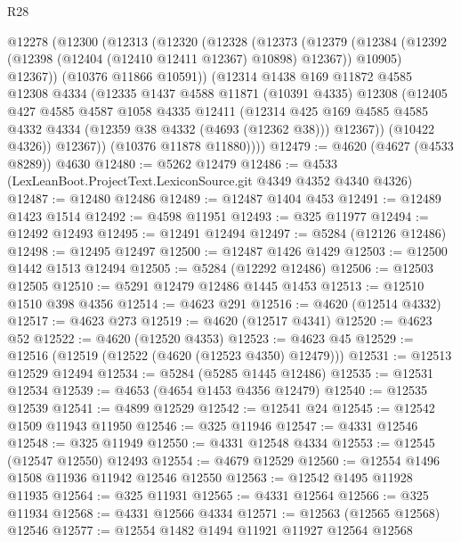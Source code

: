 \begin{lexlean}{R28}
\begin{coremodule}
    @12278
      (@12300
        (@12313
          (@12320
            (@12328
              (@12373
                (@12379
                  (@12384 (@12392 (@12398 (@12404 (@12410 @12411 @12367) @10898) @12367)) @10905)
                  @12367))
              (@10376 @11866 @10591))
            (@12314
              @1438
              @169
              @11872
              @4585
              @12308
              @4334
              (@12335
                @1437
                @4588
                @11871
                (@10391 @4335)
                @12308
                (@12405
                  @427
                  @4585
                  @4587
                  @1058
                  @4335
                  @12411
                  (@12314
                    @425
                    @169
                    @4585
                    @4585
                    @4332
                    @4334
                    (@12359 @38 @4332 (@4693 (@12362 @38)))
                    @12367))
                (@10422 @4326))
              @12367))
          (@10376 @11878 @11880))))
@12479 := @4620 (@4627 (@4533 @8289)) @4630
@12480 := @5262 @12479
@12486 := @4533 (LexLeanBoot.ProjectText.LexiconSource.git @4349 @4352 @4340 @4326)
@12487 := @12480 @12486
@12489 := @12487 @1404 @453
@12491 := @12489 @1423 @1514
@12492 := @4598 @11951
@12493 := @325 @11977
@12494 := @12492 @12493
@12495 := @12491 @12494
@12497 := @5284 (@12126 @12486)
@12498 := @12495 @12497
@12500 := @12487 @1426 @1429
@12503 := @12500 @1442 @1513 @12494
@12505 := @5284 (@12292 @12486)
@12506 := @12503 @12505
@12510 := @5291 @12479 @12486 @1445 @1453
@12513 := @12510 @1510 @398 @4356
@12514 := @4623 @291
@12516 := @4620 (@12514 @4332)
@12517 := @4623 @273
@12519 := @4620 (@12517 @4341)
@12520 := @4623 @52
@12522 := @4620 (@12520 @4353)
@12523 := @4623 @45
@12529 := @12516 (@12519 (@12522 (@4620 (@12523 @4350) @12479)))
@12531 := @12513 @12529 @12494
@12534 := @5284 (@5285 @1445 @12486)
@12535 := @12531 @12534
@12539 := @4653 (@4654 @1453 @4356 @12479)
@12540 := @12535 @12539
@12541 := @4899 @12529
@12542 := @12541 @24
@12545 := @12542 @1509 @11943 @11950
@12546 := @325 @11946
@12547 := @4331 @12546
@12548 := @325 @11949
@12550 := @4331 @12548 @4334
@12553 := @12545 (@12547 @12550) @12493
@12554 := @4679 @12529
@12560 := @12554 @1496 @1508 @11936 @11942 @12546 @12550
@12563 := @12542 @1495 @11928 @11935
@12564 := @325 @11931
@12565 := @4331 @12564
@12566 := @325 @11934
@12568 := @4331 @12566 @4334
@12571 := @12563 (@12565 @12568) @12546
@12577 := @12554 @1482 @1494 @11921 @11927 @12564 @12568

\end{coremodule}
\end{lexlean}
